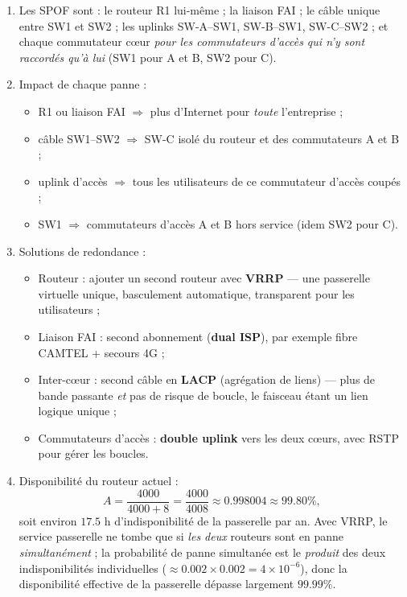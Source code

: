 \documentclass[11pt]{article}
\begin{document}
\begin{corrige}
\begin{enumerate}
\item Les SPOF sont : le routeur R1 lui-même ; la liaison FAI ; le câble unique entre SW1 et SW2 ; les uplinks SW-A--SW1, SW-B--SW1, SW-C--SW2 ; et chaque commutateur cœur \emph{pour les commutateurs d'accès qui n'y sont raccordés qu'à lui} (SW1 pour A et B, SW2 pour C).
\item Impact de chaque panne :
\begin{itemize}
\item R1 ou liaison FAI $\Rightarrow$ plus d'Internet pour \emph{toute} l'entreprise ;
\item câble SW1--SW2 $\Rightarrow$ SW-C isolé du routeur et des commutateurs A et B ;
\item uplink d'accès $\Rightarrow$ tous les utilisateurs de ce commutateur d'accès coupés ;
\item SW1 $\Rightarrow$ commutateurs d'accès A et B hors service (idem SW2 pour C).
\end{itemize}
\item Solutions de redondance :
\begin{itemize}
\item Routeur : ajouter un second routeur avec \textbf{VRRP} --- une passerelle virtuelle unique, basculement automatique, transparent pour les utilisateurs ;
\item Liaison FAI : second abonnement (\textbf{dual ISP}), par exemple fibre CAMTEL + secours 4G ;
\item Inter-cœur : second câble en \textbf{LACP} (agrégation de liens) --- plus de bande passante \emph{et} pas de risque de boucle, le faisceau étant un lien logique unique ;
\item Commutateurs d'accès : \textbf{double uplink} vers les deux cœurs, avec RSTP pour gérer les boucles.
\end{itemize}
\item Disponibilité du routeur actuel :
\[ A = \frac{4000}{4000+8} = \frac{4000}{4008} \approx 0.998004 \approx 99.80\%, \]
soit environ $17.5$ h d'indisponibilité de la passerelle par an. Avec VRRP, le service passerelle ne tombe que si \emph{les deux} routeurs sont en panne \emph{simultanément} ; la probabilité de panne simultanée est le \emph{produit} des deux indisponibilités individuelles ($\approx 0.002 \times 0.002 = 4\times10^{-6}$), donc la disponibilité effective de la passerelle dépasse largement $99.99\%$.
\end{enumerate}
\end{corrige}
\end{document}
